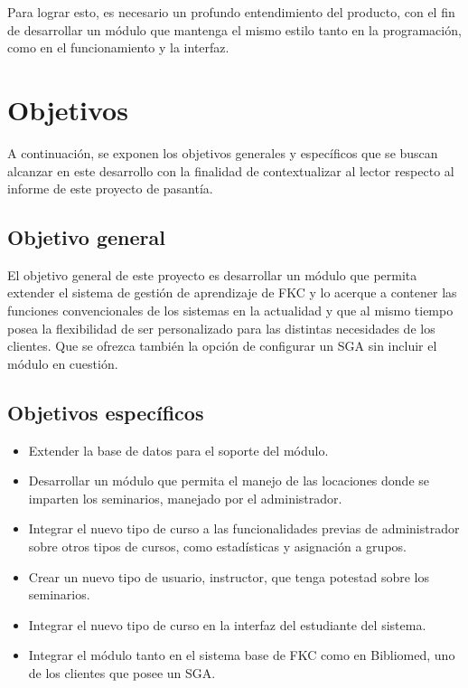 Para lograr esto, es necesario un profundo entendimiento del producto, con el fin de desarrollar un módulo que mantenga el mismo estilo tanto en la programación, como en el funcionamiento y la interfaz. 


\section*{Objetivos}
A continuación, se exponen los objetivos generales y específicos que se buscan alcanzar en este desarrollo con la finalidad de contextualizar al lector respecto al informe de este proyecto de pasantía.

\subsection*{Objetivo general}
El objetivo general de este proyecto es desarrollar un módulo que permita extender el sistema de gestión de aprendizaje de FKC y lo acerque a contener las funciones convencionales de los sistemas en la actualidad y que al mismo tiempo posea la flexibilidad de ser personalizado para las distintas necesidades de los clientes. Que se ofrezca también la opción de configurar un SGA sin incluir el módulo en cuestión.

\subsection*{Objetivos específicos}

\begin{itemize}
	\item Extender la base de datos para el soporte del módulo.
	\item Desarrollar un módulo que permita el manejo de las locaciones donde se imparten los seminarios, manejado por el administrador.
	\item Integrar el nuevo tipo de curso a las funcionalidades previas de administrador sobre otros tipos de cursos, como estadísticas y asignación a grupos.
	\item Crear un nuevo tipo de usuario, instructor, que tenga potestad sobre los seminarios.
	\item Integrar el nuevo tipo de curso en la interfaz del estudiante del sistema.
	\item Integrar el módulo tanto en el sistema base de FKC como en Bibliomed, uno de los clientes que posee un SGA.
\end{itemize}








